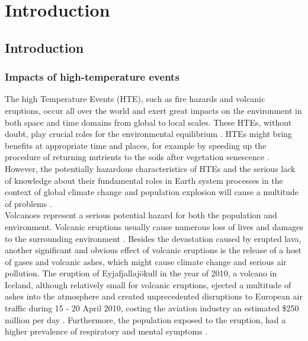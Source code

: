 \chapter{Introduction}

\label{Chapter1}

\newcommand{\keyword}[1]{\textbf{#1}}
\newcommand{\tabhead}[1]{\textbf{#1}}
\newcommand{\code}[1]{\texttt{#1}}
\newcommand{\file}[1]{\texttt{\bfseries#1}}
\newcommand{\option}[1]{\texttt{\itshape#1}}


\section{Introduction}


\subsection{Impacts of high-temperature events}

The high Temperature Events (HTE), such as fire hazards and volcanic eruptions, occur all over the world and exert great impacts on the environment in both space and time domains from global to local scales. These HTEs, without doubt, play crucial roles for the environmental equilibrium \parencite{Reference1}. HTEs might bring benefits at appropriate time and places, for example by speeding up the procedure of returning nutrients to the soils after vegetation senescence \parencite{Reference2}. However, the potentially hazardous characteristics of HTEs and the serious lack of knowledge about their fundamental roles in Earth system processes in the context of global climate change and population explosion will cause a multitude of problems \parencite{Reference3}.\\

\noindent Volcanoes represent a serious potential hazard for both the population and environment. Volcanic eruptions usually cause numerous loss of lives and damages to the surrounding environment \parencite{Reference12}. Besides the devastation caused by erupted lava, another significant and obvious effect of volcanic eruptions is the release of a host of gases and volcanic ashes, which might cause climate change and serious air pollution. The eruption of Eyjafjallajökull in the year of 2010, a volcano in Iceland, although relatively small for volcanic eruptions, ejected a multitude of ashes into the atmosphere and created unprecedented disruptions to European air traffic during 15 - 20 April 2010, costing the aviation industry an estimated \$250 million per day \parencite{Reference4}. Furthermore, the population exposed to the eruption, had a higher prevalence of respiratory and mental symptoms \parencite{Reference5}.\\

